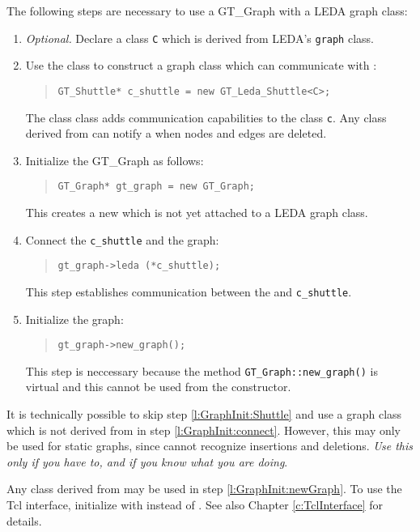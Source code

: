 \documentclass[twoside,fleqn]{report}
\begin{document}
The following steps are necessary to use a GT\_Graph with a LEDA graph 
class:

\begin{enumerate}
  
  \item
  \emph{Optional.} Declare a class \texttt{C} which is
  derived from LEDA's \texttt{graph} class.
  
  \item \label{l:GraphInit:Shuttle} Use the class  to
  construct a graph class which can communicate with :

  \begin{quote}
    \verb|GT_Shuttle* c_shuttle = new GT_Leda_Shuttle<C>;|
  \end{quote}
  
  The class  class adds communication
  capabilities to the class \texttt{c}. Any class derived from
   can notify a  when nodes and edges are
  deleted.
  
  \item \label{l:GraphInit:newGraph} Initialize the GT\_Graph as follows:
  \begin{quote}
    \verb|GT_Graph* gt_graph = new GT_Graph;|
  \end{quote}  
  This creates a new  which is not yet attached to a
  LEDA graph class.

  \item \label{l:GraphInit:connect}
  Connect the \texttt{c\_shuttle} and the  graph:
  \begin{quote}
    \verb|gt_graph->leda (*c_shuttle);|
  \end{quote}
  This step establishes communication between the
   and \texttt{c\_shuttle}.
    
  \item \label{l:GraphInit:initialize} Initialize the graph:
  \begin{quote}
    \verb|gt_graph->new_graph();|
  \end{quote}
  This step is neccessary because the method
  \texttt{GT\_Graph::new\_graph()} is virtual and this cannot be
  used from the constructor.
  
\end{enumerate}

\begin{notes}
  
  \item \label{n:InitializingGraph} It is technically possible to
  skip step \ref{l:GraphInit:Shuttle} and use a graph class which
  is not derived from  in step
  \ref{l:GraphInit:connect}. However, this may only be used for
  static graphs, since  cannot recognize insertions and
  deletions. \emph{Use this only if you have to, and if you know
    what you are doing}.
  
  \item Any class derived from  may be used in step
  \ref{l:GraphInit:newGraph}. To use the Tcl interface,
  initialize with  instead of .  See
  also Chapter \ref{c:TclInterface} for details.

\end{notes}
\end{document}
